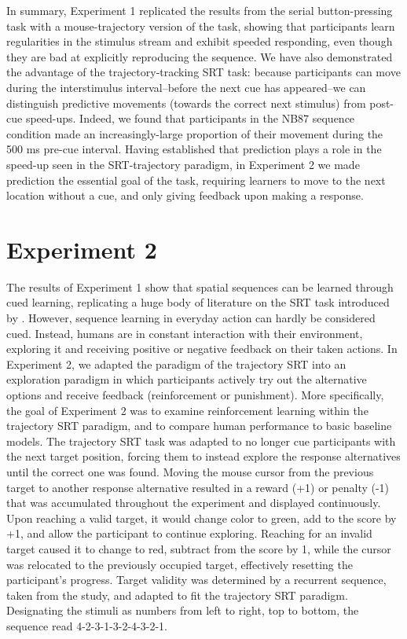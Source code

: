 \documentclass[man,floatsintext]{apa6}
\begin{document}
In summary, Experiment 1 replicated the results from the  serial button-pressing task with a mouse-trajectory version of the task, showing that participants learn regularities in the stimulus stream and exhibit speeded responding, even though they are bad at explicitly reproducing the sequence. We have also demonstrated the advantage of the trajectory-tracking SRT task: because participants can move during the interstimulus interval--before the next cue has appeared--we can distinguish predictive movements (towards the correct next stimulus) from post-cue speed-ups. Indeed, we found that participants in the NB87 sequence condition made an increasingly-large proportion of their movement during the 500 ms pre-cue interval. Having established that prediction plays a role in the speed-up seen in the SRT-trajectory paradigm, in Experiment 2 we made prediction the essential goal of the task, requiring learners to move to the next location without a cue, and only giving feedback upon making a response.

\section{Experiment 2}

The results of Experiment 1 show that spatial sequences can be learned through cued learning, replicating a huge body of literature on the SRT task introduced by . However, sequence learning in everyday action can hardly be considered cued. Instead, humans are in constant interaction with their environment, exploring it and receiving positive or negative feedback on their taken actions. In Experiment 2, we adapted the paradigm of the trajectory SRT into an exploration paradigm in which participants actively try out the alternative options and receive feedback (reinforcement or punishment). More specifically, the goal of Experiment 2 was to examine reinforcement learning within the trajectory SRT paradigm, and to compare human performance to basic baseline models. The trajectory SRT task was adapted to no longer cue participants with the next target position, forcing them to instead explore the response alternatives until the correct one was found. Moving the mouse cursor from the previous target to another response alternative resulted in a reward (+1) or penalty (-1) that was accumulated throughout the experiment and displayed continuously. Upon reaching a valid target, it would change color to green, add to the score by +1, and allow the participant to continue exploring. Reaching for an invalid target caused it to change to red, subtract from the score by 1, while the cursor was relocated to the previously occupied target, effectively resetting the participant's progress. Target validity was determined by a recurrent sequence, taken from the  study, and adapted to fit the trajectory SRT paradigm. Designating the stimuli as numbers from left to right, top to bottom, the sequence read 4-2-3-1-3-2-4-3-2-1.
\end{document}
